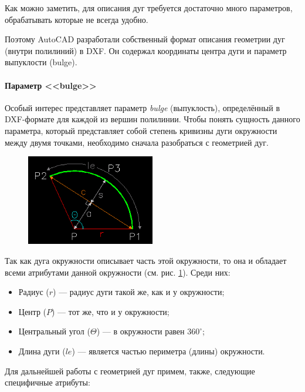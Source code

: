 Как можно заметить, для описания дуг требуется достаточно много параметров, обрабатывать которые не всегда удобно.

Поэтому AutoCAD разработали собственный формат описания геометрии дуг (внутри полилиний) в DXF. Он содержал координаты центра дуги и параметр выпуклости (bulge).

\paragraph{Параметр <<bulge>>} \label{sec:bulge}

Особый интерес представляет параметр \textit{bulge} (выпуклость), определённый в DXF-формате для каждой из вершин полилинии.
Чтобы понять сущность данного параметра, который представляет собой степень кривизны дуги окружности между двумя точками, необходимо сначала разобраться с геометрией дуг.

\begin{figure}[H]
	\centering
	\includegraphics[width=0.5\textwidth]{figures/arcgeom.png}
	\label{fig:arcgeom}
\end{figure}

Так как дуга окружности описывает часть этой окружности, то она и обладает всеми атрибутами данной окружности (см. рис. \ref{fig:arcgeom}). Среди них:

\begin{itemize}
	\item Радиус ($r$) --- радиус дуги такой же, как и у окружности;
	\item Центр ($P$) --- тот же, что и у окружности;
	\item Центральный угол ($\Theta$) --- в окружности равен $360^{\circ}$;
	\item Длина дуги ($le$) --- является частью периметра (длины) окружности.
\end{itemize}

Для дальнейшей работы с геометрией дуг примем, также, следующие специфичные атрибуты:


